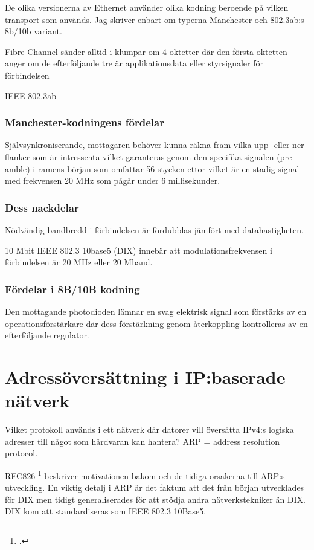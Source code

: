 \documentclass[swedish,10pt,a4paper]{report}
\begin{document}
De olika versionerna av Ethernet använder olika kodning beroende på vilken transport som
används. Jag skriver enbart om typerna Manchester och 802.3ab:s 8b/10b variant.

Fibre Channel sänder alltid i klumpar om 4 oktetter där den första oktetten anger
om de efterföljande tre är applikationsdata eller styrsignaler för förbindelsen

IEEE 802.3ab

\subsection{Manchester-kodningens fördelar}\label{subsec:manchester_pros}

Självsynkroniserande, mottagaren behöver kunna räkna fram vilka upp-
eller ner-flanker som är intressenta vilket garanteras genom den specifika
signalen (pre-amble) i ramens början som omfattar 56 stycken ettor vilket
är en stadig signal med frekvensen 20 MHz som pågår under 6 millisekunder.

\subsection{Dess nackdelar}\label{subsec:manchester_cons}

Nödvändig bandbredd i förbindelsen är fördubblas jämfört med datahastigheten.

10 Mbit IEEE 802.3 10base5 (DIX) innebär att modulationsfrekvensen i förbindelsen är 20 MHz eller 20 Mbaud.

\subsection{Fördelar i 8B/10B kodning}\label{sec:8b10bkodning}

Den mottagande photodioden lämnar en svag elektrisk signal som förstärks av
en operationsförstärkare där dess förstärkning genom återkoppling kontrolleras av en efterföljande
regulator.

\chapter{Adressöversättning i IP:baserade nätverk}\label{chap:address_translation}

Vilket protokoll används i ett nätverk där datorer vill översätta IPv4:s logiska adresser till något
som hårdvaran kan hantera? ARP = address resolution protocol.

RFC826 \footcite{rfc826} beskriver motivationen bakom och de tidiga orsakerna till ARP:s
utveckling. En viktig detalj i ARP är det faktum att det från
början utvecklades för DIX men tidigt generaliserades för att stödja
andra nätverkstekniker än DIX. DIX kom att standardiseras som IEEE 802.3 10Base5.
\end{document}
